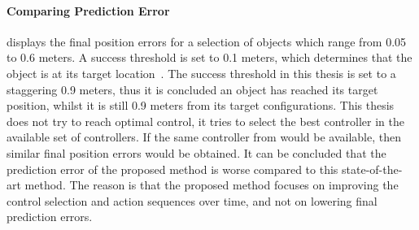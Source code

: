 \paragraph{Comparing Prediction Error}
\citeauthor{sabbaghnovin_model_2021} displays the final position errors for a selection of objects which range from 0.05 to 0.6 meters. A success threshold is set to 0.1 meters, which determines that the object is at its target location~\cite{sabbaghnovin_model_2021}. The success threshold in this thesis is set to a staggering 0.9 meters, thus it is concluded an object has reached its target position, whilst it is still 0.9 meters from its target configurations. This thesis does not try to reach optimal control, it tries to select the best controller in the available set of controllers. If the same controller from \citeauthor{sabbaghnovin_model_2021} would be available, then similar final position errors would be obtained. It can be concluded that the prediction error of the proposed method is worse compared to this state-of-the-art method. The reason is that the proposed method focuses on improving the control selection and action sequences over time, and not on lowering final prediction errors.\bs 

